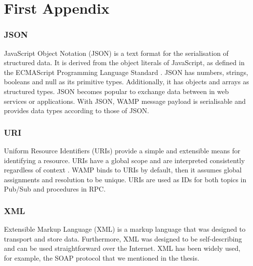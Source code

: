 \chapter{First Appendix}
\label{chapter:first-appendix}

\subsection{JSON}

JavaScript Object Notation (JSON) is a text format for the serialisation of structured data. It is derived from the object literals of JavaScript, as defined in the ECMAScript Programming Language Standard \cite{crockford2006application}. JSON has numbers, strings, booleans and null as its primitive types. Additionally, it has objects and arrays as structured types. JSON becomes popular to exchange data between in web services or applications. With JSON, WAMP message payload is serialisable and provides data types according to those of JSON. 

\subsection{URI}

Uniform Resource Identifiers (URIs) provide a simple and extensible means for identifying a resource. URIs have a global scope and are interpreted consistently regardless of context \cite{masinter2005uniform}. WAMP binds to URIs by default, then it assumes global assignments and resolution to be unique. URIs are used as IDs for both topics in Pub/Sub and procedures in RPC. 

\subsection{XML}
Extensible Markup Language (XML) is a markup language that was designed to transport and store data. Furthermore, XML was designed to be self-describing and can be used straightforward over the Internet. XML has been widely used, for example, the SOAP protocol that we mentioned in the thesis. 
